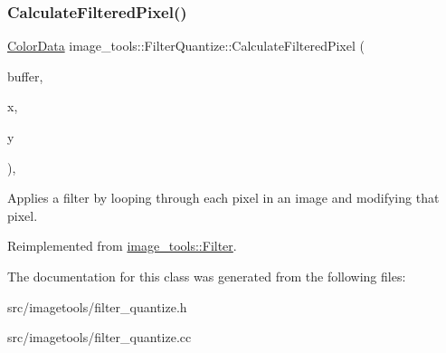 \subsubsection{\texorpdfstring{Calculate\+Filtered\+Pixel()}{CalculateFilteredPixel()}}
{\footnotesize\ttfamily \hyperlink{classimage__tools_1_1ColorData}{Color\+Data} image\+\_\+tools\+::\+Filter\+Quantize\+::\+Calculate\+Filtered\+Pixel (\begin{DoxyParamCaption}\item[{\hyperlink{classimage__tools_1_1PixelBuffer}{Pixel\+Buffer} $\ast$}]{buffer,  }\item[{int}]{x,  }\item[{int}]{y }\end{DoxyParamCaption})\hspace{0.3cm}{\ttfamily [override]}, {\ttfamily [virtual]}}

Applies a filter by looping through each pixel in an image and modifying that pixel. 

Reimplemented from \hyperlink{classimage__tools_1_1Filter_a68d38fa12b87e20b81090cb380c0a307}{image\+\_\+tools\+::\+Filter}.



The documentation for this class was generated from the following files\+:\begin{DoxyCompactItemize}
\item 
src/imagetools/filter\+\_\+quantize.\+h\item 
src/imagetools/filter\+\_\+quantize.\+cc\end{DoxyCompactItemize}
